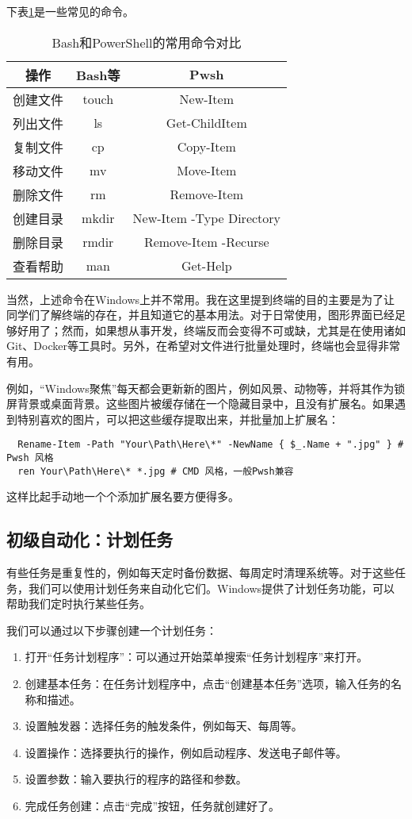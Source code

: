 下表\ref{tab:terminal-commands}是一些常见的命令。

\begin{table}[ht]
  \centering
  \begin{tabular}{c|cc}
    \hline
    \textbf{操作} & \textbf{Bash等} & \textbf{Pwsh} \\
    \hline
    创建文件 & touch & New-Item \\
    列出文件 & ls & Get-ChildItem \\
    复制文件 & cp & Copy-Item \\
    移动文件 & mv & Move-Item \\
    删除文件 & rm & Remove-Item \\
    创建目录 & mkdir & New-Item -Type Directory \\
    删除目录 & rmdir & Remove-Item -Recurse \\
    查看帮助 & man & Get-Help \\
    \hline
  \end{tabular}
  \caption{Bash和PowerShell的常用命令对比}
  \label{tab:terminal-commands}
\end{table}

当然，上述命令在Windows上并不常用。我在这里提到终端的目的主要是为了让同学们了解终端的存在，并且知道它的基本用法。对于日常使用，图形界面已经足够好用了；然而，如果想从事开发，终端反而会变得不可或缺，尤其是在使用诸如Git、Docker等工具时。另外，在希望对文件进行批量处理时，终端也会显得非常有用。

例如，“Windows聚焦”每天都会更新新的图片，例如风景、动物等，并将其作为锁屏背景或桌面背景。这些图片被缓存储在一个隐藏目录中，且没有扩展名。如果遇到特别喜欢的图片，可以把这些缓存提取出来，并批量加上扩展名：
\begin{lstlisting}
  Rename-Item -Path "Your\Path\Here\*" -NewName { $_.Name + ".jpg" } # Pwsh 风格
  ren Your\Path\Here\* *.jpg # CMD 风格，一般Pwsh兼容
\end{lstlisting}
这样比起手动地一个个添加扩展名要方便得多。

\subsection{初级自动化：计划任务}

有些任务是重复性的，例如每天定时备份数据、每周定时清理系统等。对于这些任务，我们可以使用计划任务来自动化它们。Windows提供了计划任务功能，可以帮助我们定时执行某些任务。

我们可以通过以下步骤创建一个计划任务：
\begin{enumerate}
  \item 打开“任务计划程序”：可以通过开始菜单搜索“任务计划程序”来打开。
  \item 创建基本任务：在任务计划程序中，点击“创建基本任务”选项，输入任务的名称和描述。
  \item 设置触发器：选择任务的触发条件，例如每天、每周等。
  \item 设置操作：选择要执行的操作，例如启动程序、发送电子邮件等。
  \item 设置参数：输入要执行的程序的路径和参数。
  \item 完成任务创建：点击“完成”按钮，任务就创建好了。
\end{enumerate}

